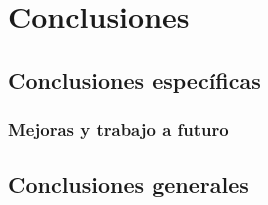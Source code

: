 \chapter{Conclusiones}

\section{Conclusiones específicas}
\subsection{Mejoras y trabajo a futuro}
\section{Conclusiones generales}